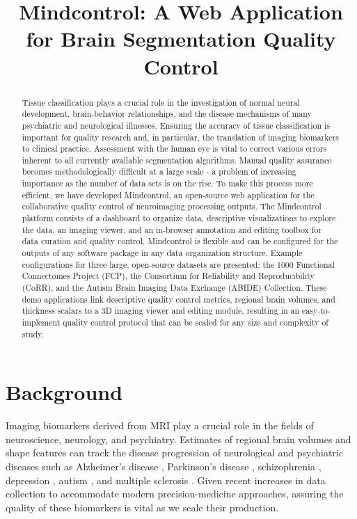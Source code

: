 


\usepackage[section]{placeins} 



\title{Mindcontrol: A Web Application for Brain Segmentation Quality Control}
\begin{abstract}Tissue classification plays a crucial role in the investigation of normal neural development, brain-behavior relationships, and the disease mechanisms of many psychiatric and neurological illnesses. Ensuring the accuracy of tissue classification is important for quality research and, in particular, the translation of imaging biomarkers to clinical practice. Assessment with the human eye is vital to correct various errors inherent to all currently available segmentation algorithms. Manual quality assurance becomes methodologically difficult at a large scale - a problem of increasing importance as the number of data sets is on the rise. To make this process more efficient, we have developed Mindcontrol, an open-source web application for the collaborative quality control of neuroimaging processing outputs. The Mindcontrol platform consists of a dashboard to organize data, descriptive visualizations to explore the data, an imaging viewer, and an in-browser annotation and editing toolbox for data curation and quality control. Mindcontrol is flexible and can be configured for the outputs of any software package in any data organization structure. Example configurations for three large, open-source datasets are presented: the 1000 Functional Connectomes Project (FCP), the Consortium for Reliability and Reproducibility (CoRR), and the Autism Brain Imaging Data Exchange (ABIDE) Collection. These demo applications link descriptive quality control metrics, regional brain volumes, and thickness scalars to a 3D imaging viewer and editing module, resulting in an easy-to-implement quality control protocol that can be scaled for any size and complexity of study.\end{abstract}

\section{Background}


Imaging biomarkers derived from MRI play a crucial role in the fields of neuroscience, neurology, and psychiatry. Estimates of regional brain volumes and shape features can track the disease progression of  neurological and psychiatric diseases such as Alzheimer's disease \cite{18632739,Vemuri_2010}, Parkinson's disease \cite{Silvia_Mangia_2013}, schizophrenia \cite{shenton2001review}, depression \cite{meisenzahl2011structural}, autism \cite{brambilla2003brain}, and multiple sclerosis \cite{Filippi_1995}. Given recent increases in data collection to accommodate modern precision-medicine approaches, assuring the quality of these biomarkers is vital as we scale their production. 

